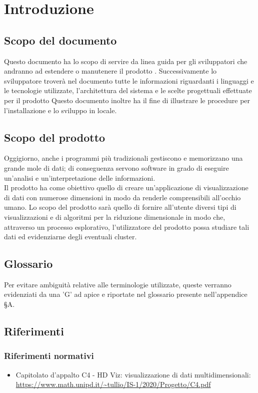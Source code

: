 \section{Introduzione}
\subsection{Scopo del documento}
Questo documento ha lo scopo di servire da linea guida per gli sviluppatori che andranno ad estendere o manutenere il prodotto \NomeProgetto{}. Successivamente lo sviluppatore troverà nel documento tutte le informazioni riguardanti i linguaggi e le tecnologie utilizzate, l'architettura del sistema e le scelte progettuali effettuate per il prodotto Questo documento inoltre ha il fine di illustrare le procedure per l'installazione e lo sviluppo in locale.

\subsection{Scopo del prodotto}
Oggigiorno, anche i programmi più tradizionali gestiscono e memorizzano una grande mole di dati; di conseguenza servono software in grado di eseguire un'analisi e un'interpretazione delle informazioni.\\
Il prodotto \NomeProgetto{} ha come obiettivo quello di creare un'applicazione di visualizzazione di dati con numerose dimensioni in modo da renderle comprensibili all'occhio umano.  Lo scopo del prodotto sarà quello di fornire all'utente diversi tipi di visualizzazioni e di algoritmi per la riduzione dimensionale in modo che, attraverso un processo esplorativo, l'utilizzatore del prodotto possa studiare tali dati ed evidenziarne degli eventuali cluster. 

\subsection{Glossario}
Per evitare ambiguità relative alle terminologie utilizzate, queste verranno evidenziati da una 'G' ad apice e riportate nel glossario presente nell'appendice \S A.

\subsection{Riferimenti}
\subsubsection{Riferimenti normativi}
\begin{itemize}
	\item	Capitolato d'appalto C4 - HD Viz: visualizzazione di dati multidimensionali: \\
	\textcolor{blue}{\url{https://www.math.unipd.it/~tullio/IS-1/2020/Progetto/C4.pdf}}
\end{itemize}

